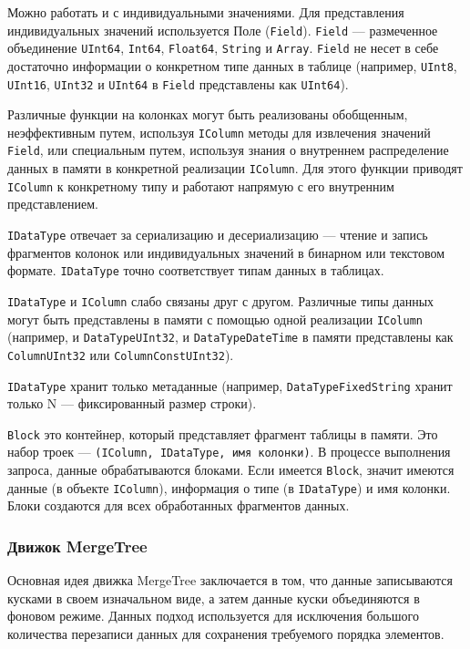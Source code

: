 Можно работать и с индивидуальными значениями. Для представления индивидуальных значений используется Поле (\texttt{Field}). \texttt{Field} --- размеченное объединение \texttt{UInt64}, \texttt{Int64}, \texttt{Float64}, \texttt{String} и \texttt{Array}. \texttt{Field} не несет в себе достаточно информации о конкретном типе данных в таблице (например, \texttt{UInt8}, \texttt{UInt16}, \texttt{UInt32} и \texttt{UInt64} в \texttt{Field} представлены как \texttt{UInt64}).

Различные функции на колонках могут быть реализованы обобщенным, неэффективным путем, используя \texttt{IColumn} методы для извлечения значений \texttt{Field}, или специальным путем, используя знания о внутреннем распределение данных в памяти в конкретной реализации \texttt{IColumn}. Для этого функции приводят \texttt{IColumn} к конкретному типу и работают напрямую с его внутренним представлением.

\texttt{IDataType} отвечает за сериализацию и десериализацию --- чтение и запись фрагментов колонок или индивидуальных значений в бинарном или текстовом формате.  \texttt{IDataType} точно соответствует типам данных в таблицах.

\texttt{IDataType} и \texttt{IColumn} слабо связаны друг с другом. Различные типы данных могут быть представлены в памяти с помощью одной реализации \texttt{IColumn} (например, и \texttt{DataTypeUInt32}, и \texttt{DataTypeDateTime} в памяти представлены как \texttt{ColumnUInt32} или \texttt{ColumnConstUInt32}).

\texttt{IDataType} хранит только метаданные (например, \texttt{DataTypeFixedString} хранит только N --- фиксированный размер строки).

\texttt{Block} это контейнер, который представляет фрагмент таблицы в памяти. Это набор троек --- \texttt{(IColumn, IDataType, имя колонки)}. В процессе выполнения запроса, данные обрабатываются блоками. Если имеется \texttt{Block}, значит имеются данные (в объекте \texttt{IColumn}), информация о типе (в \texttt{IDataType}) и имя колонки. Блоки создаются для всех обработанных фрагментов данных.

\subsubsection{Движок MergeTree}

Основная идея движка MergeTree заключается в том, что данные записываются кусками в своем изначальном виде, а затем данные куски объединяются в фоновом режиме. Данных подход используется для исключения большого количества перезаписи данных для сохранения требуемого порядка элементов.


